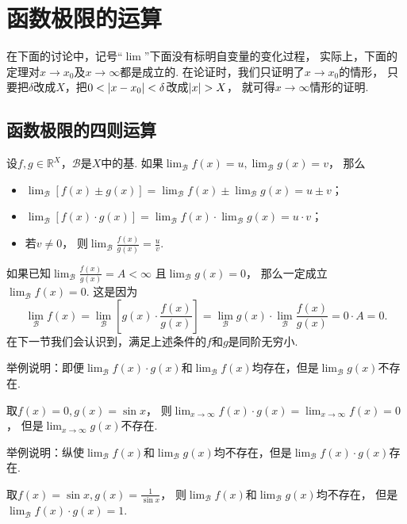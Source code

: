 \section{函数极限的运算}
在下面的讨论中，记号“\(\lim\)”下面没有标明自变量的变化过程，
实际上，下面的定理对\(x \to x_0\)及\(x \to \infty\)都是成立的.
在论证时，我们只证明了\(x \to x_0\)的情形，
只要把\(\delta\)改成\(X\)，把\(0<\abs{x-x_0}<\delta\)改成\(\abs{x}>X\)，
就可得\(x\to\infty\)情形的证明.

\subsection{函数极限的四则运算}
\begin{theorem}\label{theorem:极限.极限的四则运算法则}
设\(f,g\in\mathbb{R}^X\)，\(\mathcal{B}\)是\(X\)中的基.
如果\(\lim_\mathcal{B} f(x) = u,
\lim_\mathcal{B} g(x) = v\)，
那么\begin{itemize}
	\item \(\lim_\mathcal{B} [f(x) \pm g(x)]
	= \lim_\mathcal{B} f(x) \pm \lim_\mathcal{B} g(x)
	= u \pm v\)；

	\item \(\lim_\mathcal{B} [f(x) \cdot g(x)]
	= \lim_\mathcal{B} f(x) \cdot \lim_\mathcal{B} g(x)
	= u \cdot v\)；

	\item 若\(v\neq0\)，
	则\(\lim_\mathcal{B} \frac{f(x)}{g(x)} = \frac{u}{v}\).
\end{itemize}
\end{theorem}
\begin{remark}
如果已知\(\lim_\mathcal{B} \frac{f(x)}{g(x)} = A < \infty\)
且\(\lim_\mathcal{B} g(x) = 0\)，
那么一定成立\(\lim_\mathcal{B} f(x) = 0\).
这是因为\begin{equation*}
	\lim_\mathcal{B} f(x)
	= \lim_\mathcal{B} \left[
			g(x) \cdot \frac{f(x)}{g(x)}
		\right]
	= \lim_\mathcal{B} g(x) \cdot \lim_\mathcal{B} \frac{f(x)}{g(x)}
	= 0 \cdot A = 0.
\end{equation*}
在下一节我们会认识到，满足上述条件的\(f\)和\(g\)是同阶无穷小.
\end{remark}
\begin{example}
举例说明：即便\(\lim_\mathcal{B} f(x) \cdot g(x)\)和\(\lim_\mathcal{B} f(x)\)均存在，但是\(\lim_\mathcal{B} g(x)\)不存在.
\begin{solution}
取\(f(x) = 0,
g(x) = \sin x\)，
则\(\lim_{x\to\infty} f(x) \cdot g(x)
= \lim_{x\to\infty} f(x)
= 0\)，
但是\(\lim_{x\to\infty} g(x)\)不存在.
\end{solution}
\end{example}
\begin{example}
举例说明：纵使\(\lim_\mathcal{B} f(x)\)和\(\lim_\mathcal{B} g(x)\)均不存在，但是\(\lim_\mathcal{B} f(x) \cdot g(x)\)存在.
\begin{solution}
取\(f(x) = \sin x,
g(x) = \frac1{\sin x}\)，
则\(\lim_\mathcal{B} f(x)\)和\(\lim_\mathcal{B} g(x)\)均不存在，
但是\(\lim_\mathcal{B} f(x) \cdot g(x) = 1\).
\end{solution}
\end{example}

